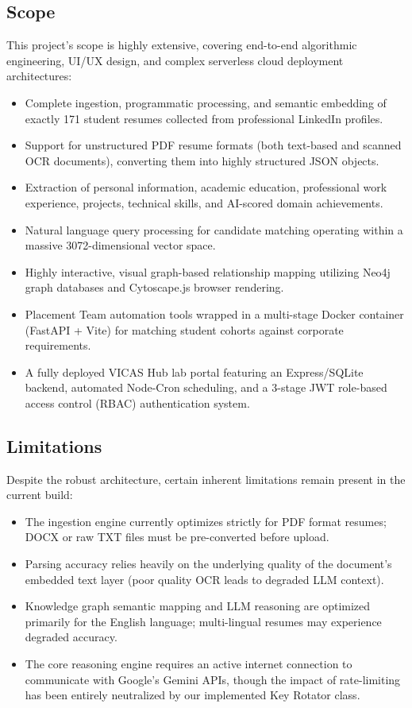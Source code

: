 \documentclass[12pt,a4paper]{report}
\begin{document}
\subsection{Scope}
This project's scope is highly extensive, covering end-to-end algorithmic engineering, UI/UX design, and complex serverless cloud deployment architectures:
\begin{itemize}
    \item Complete ingestion, programmatic processing, and semantic embedding of exactly 171 student resumes collected from professional LinkedIn profiles.
    \item Support for unstructured PDF resume formats (both text-based and scanned OCR documents), converting them into highly structured JSON objects.
    \item Extraction of personal information, academic education, professional work experience, projects, technical skills, and AI-scored domain achievements.
    \item Natural language query processing for candidate matching operating within a massive 3072-dimensional vector space.
    \item Highly interactive, visual graph-based relationship mapping utilizing Neo4j graph databases and Cytoscape.js browser rendering.
    \item Placement Team automation tools wrapped in a multi-stage Docker container (FastAPI + Vite) for matching student cohorts against corporate requirements.
    \item A fully deployed VICAS Hub lab portal featuring an Express/SQLite backend, automated Node-Cron scheduling, and a 3-stage JWT role-based access control (RBAC) authentication system.
\end{itemize}

\subsection{Limitations}
Despite the robust architecture, certain inherent limitations remain present in the current build:
\begin{itemize}
    \item The ingestion engine currently optimizes strictly for PDF format resumes; DOCX or raw TXT files must be pre-converted before upload.
    \item Parsing accuracy relies heavily on the underlying quality of the document's embedded text layer (poor quality OCR leads to degraded LLM context).
    \item Knowledge graph semantic mapping and LLM reasoning are optimized primarily for the English language; multi-lingual resumes may experience degraded accuracy.
    \item The core reasoning engine requires an active internet connection to communicate with Google's Gemini APIs, though the impact of rate-limiting has been entirely neutralized by our implemented Key Rotator class.
\end{itemize}
\end{document}
